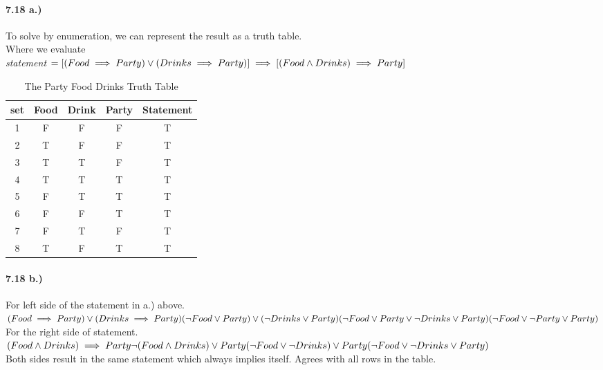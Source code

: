 \documentclass[12pt]{article}
\begin{document}
\paragraph{7.18 a.)} To solve by enumeration, we can represent the result as a truth table.\\
Where we evaluate \\
\textit{statement} $=[(Food \implies Party) \lor (Drinks \implies Party)]\\
\implies [(Food \land Drinks) \implies Party]$\\
\begin{table}[h]
\begin{center}
\caption{ The Party Food Drinks Truth Table } \label{tab:title} 
\begin{tabular}{|c|c c c|c|} 
\hline
set&Food&Drink&Party&Statement\\ [0.5ex] 
\hline
1 & F & F & F  &T\\
\hline
2 & T & F & F & T\\
\hline
3 & T & T & F & T\\
\hline
4 & T & T & T & T\\
\hline
5 & F & T & T & T\\
\hline
6 & F & F & T & T\\
\hline
7 & F & T & F & T\\
\hline
8 & T & F & T & T\\[1ex] 
 \hline
\end{tabular}
\end{center}
\end{table}
\paragraph{7.18 b.)} For left side of the statement in a.) above.\\
$(Food \implies Party)\lor (Drinks \implies Party)\\
(\neg Food \lor Party) \lor (\neg Drinks \lor Party)\\
(\neg Food \lor Party \lor \neg Drinks \lor Party)\\
(\neg Food \lor \neg Party \lor Party)$
\\For the right side of statement.\\
$(Food \land Drinks) \implies Party\\
\neg (Food \land Drinks) \lor Party\\
( \neg Food \lor \neg Drinks) \lor Party \\
(\neg Food \lor \neg Drinks \lor Party)$\\
Both sides result in the same statement which always implies itself. Agrees with all rows in the table.
\end{document}
